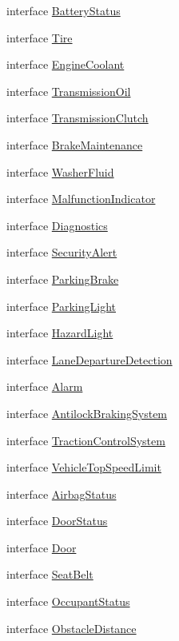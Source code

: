 \begin{DoxyCompactItemize}
\item 
interface \hyperlink{interfaceBatteryStatus}{Battery\+Status}
\item 
interface \hyperlink{interfaceTire}{Tire}
\item 
interface \hyperlink{interfaceEngineCoolant}{Engine\+Coolant}
\item 
interface \hyperlink{interfaceTransmissionOil}{Transmission\+Oil}
\item 
interface \hyperlink{interfaceTransmissionClutch}{Transmission\+Clutch}
\item 
interface \hyperlink{interfaceBrakeMaintenance}{Brake\+Maintenance}
\item 
interface \hyperlink{interfaceWasherFluid}{Washer\+Fluid}
\item 
interface \hyperlink{interfaceMalfunctionIndicator}{Malfunction\+Indicator}
\item 
interface \hyperlink{interfaceDiagnostics}{Diagnostics}
\item 
interface \hyperlink{interfaceSecurityAlert}{Security\+Alert}
\item 
interface \hyperlink{interfaceParkingBrake}{Parking\+Brake}
\item 
interface \hyperlink{interfaceParkingLight}{Parking\+Light}
\item 
interface \hyperlink{interfaceHazardLight}{Hazard\+Light}
\item 
interface \hyperlink{interfaceLaneDepartureDetection}{Lane\+Departure\+Detection}
\item 
interface \hyperlink{interfaceAlarm}{Alarm}
\item 
interface \hyperlink{interfaceAntilockBrakingSystem}{Antilock\+Braking\+System}
\item 
interface \hyperlink{interfaceTractionControlSystem}{Traction\+Control\+System}
\item 
interface \hyperlink{interfaceVehicleTopSpeedLimit}{Vehicle\+Top\+Speed\+Limit}
\item 
interface \hyperlink{interfaceAirbagStatus}{Airbag\+Status}
\item 
interface \hyperlink{interfaceDoorStatus}{Door\+Status}
\item 
interface \hyperlink{interfaceDoor}{Door}
\item 
interface \hyperlink{interfaceSeatBelt}{Seat\+Belt}
\item 
interface \hyperlink{interfaceOccupantStatus}{Occupant\+Status}
\item 
interface \hyperlink{interfaceObstacleDistance}{Obstacle\+Distance}

\end{DoxyCompactItemize}
